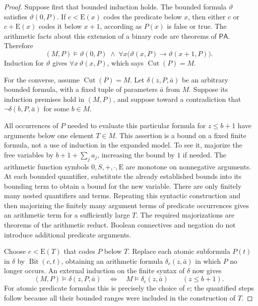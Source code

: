 \documentclass[11pt]{article}
\numberwithin{equation}{section}
\theoremstyle{definition}
\theoremstyle{remark}
\newcommand{\PA}{\mathsf{PA}}
\newcommand{\E}{\mathrm E}
\newcommand{\Bit}{\operatorname{Bit}}
\newcommand{\Cut}{\operatorname{Cut}}
\begin{document}
\begin{proof}
Suppose first that bounded induction holds.  The bounded formula
$\vartheta$ satisfies $\vartheta(0,P)$.  If $c<\E(x)$ codes the
predicate below $x$, then either $c$ or $c+\E(x)$ codes it below
$x+1$, according as $P(x)$ is false or true.  The arithmetic facts
about this extension of a binary code are theorems of $\PA$.
Therefore
\[
 (M,P)\models
 \vartheta(0,P)\;\wedge\;
 \forall x\bigl(\vartheta(x,P)\rightarrow\vartheta(x+1,P)\bigr).
\]
Induction for $\vartheta$ gives $\forall x\,\vartheta(x,P)$,
which says $\Cut(P)=M$.

For the converse, assume $\Cut(P)=M$.  Let
$\delta(z,P,\bar a)$ be an arbitrary bounded formula, with a fixed
tuple of parameters $\bar a$ from $M$.  Suppose its induction
premises hold in $(M,P)$, and suppose toward a contradiction that
$\neg\delta(b,P,\bar a)$ for some $b\in M$.

All occurrences of $P$ needed to evaluate this particular formula
for $z\le b+1$ have arguments below one element $T\in M$.
This assertion is a bound on a fixed finite formula, not a use of
induction in the expanded model.  To see it, majorize the free
variables by $b+1+\sum_j a_j$, increasing the bound by $1$ if needed.
The arithmetic function symbols $0,S,+,\cdot,\E$ are monotone on
nonnegative arguments.  At each bounded quantifier, substitute the
already established bounds into its bounding term to obtain a bound
for the new variable.  There are only finitely many nested quantifiers
and terms.  Repeating this syntactic construction and then majorizing
the finitely many argument terms of predicate occurrences gives an
arithmetic term for a sufficiently large $T$.  The required
majorizations are theorems of the arithmetic reduct.  Boolean
connectives and negation do not introduce additional predicate
arguments.

Choose $c<\E(T)$ that codes $P$ below $T$.  Replace each atomic
subformula $P(t)$ in $\delta$ by $\Bit(c,t)$, obtaining an arithmetic
formula $\delta_c(z,\bar a)$ in which $P$ no longer occurs.
An external induction on the finite syntax of $\delta$ now gives
\begin{equation}
 (M,P)\models\delta(z,P,\bar a)
 \quad\Longleftrightarrow\quad
 M\models\delta_c(z,\bar a)
 \qquad(z\le b+1).
 \label{rbc:eq:induction-local-substitution}
\end{equation}
For atomic predicate formulas this is precisely the choice of $c$;
the quantified steps follow because all their bounded ranges were
included in the construction of $T$.


\end{proof}
\end{document}
